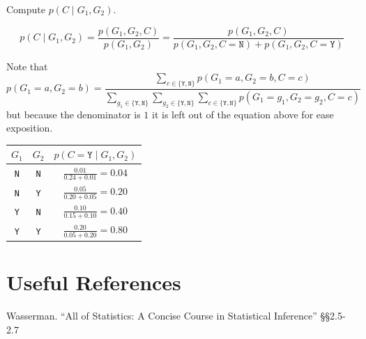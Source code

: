 Compute $p(C\mid G_1,G_2)$.

\[
p(C\mid G_1,G_2) = \frac{p(G_1,G_2,C)}{p(G_1,G_2)} =  \frac{p(G_1,G_2,C)}{p(G_1,G_2,C=\texttt{N})+p(G_1,G_2,C=\texttt{Y})} 
\]

Note that \[p(G_1=a,G_2=b) = \frac{\sum_{c\in\{\texttt{Y},\texttt{N}\}}p(G_1=a,G_2=b,C=c)}{\sum_{g_1\in\{\texttt{Y},\texttt{N}\}}\sum_{g_2\in\{\texttt{Y},\texttt{N}\}}\sum_{c\in\{\texttt{Y},\texttt{N}\}}p(G_1=g_1,G_2=g_2,C=c)}\]
but because the denominator is $1$ it is left out of the equation above for ease exposition. 

\begin{center}
\begin{tabular}{c|c|c}
$G_1$ & $G_2$ & $p(C=\texttt{Y}\mid G_1,G_2)$\\
\hline\hline
\texttt{N}& \texttt{N}& $\frac{0.01}{0.24+0.01} = 0.04$\\
\texttt{N}& \texttt{Y}& $\frac{0.05}{0.20+0.05} = 0.20$\\
\texttt{Y}& \texttt{N}& $\frac{0.10}{0.15+0.10} = 0.40$\\
\texttt{Y}& \texttt{Y}& $\frac{0.20}{0.05+0.20} = 0.80$\\
\end{tabular}
\end{center}


\section*{Useful References}
Wasserman. ``All of Statistics: A Concise Course in Statistical Inference'' \S\S 2.5-2.7

